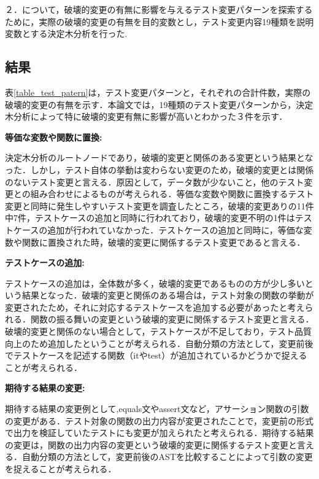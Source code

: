 \documentclass[uplatex,dvipdfmx,a4paper,twocolumn,base=11pt,jbase=11pt,ja=standard]{bxjsarticle}  %
\begin{document}
２．について，破壊的変更の有無に影響を与えるテスト変更パターンを探索するために，実際の破壊的変更の有無を目的変数とし，テスト変更内容19種類を説明変数とする決定木分析を行った.

\subsection{結果}

表\ref{table_test_patern}は，テスト変更パターンと，それぞれの合計件数，実際の破壊的変更の有無を示す．本論文では，19種類のテスト変更パターンから，決定木分析によって特に破壊的変更有無に影響が高いとわかった３件を示す．

\noindent\textbf{等価な変数や関数に置換: }

決定木分析のルートノードであり，破壊的変更と関係のある変更という結果となった．しかし，テスト自体の挙動は変わらない変更のため，破壊的変更とは関係のないテスト変更と言える．原因として，データ数が少ないこと，他のテスト変更との組み合わせによるものが考えられる．等価な変数や関数に置換するテスト変更と同時に発生しやすいテスト変更を調査したところ，破壊的変更ありの11件中7件，テストケースの追加と同時に行われており，破壊的変更不明の1件はテストケースの追加が行われていなかった．テストケースの追加と同時に，等価な変数や関数に置換された時，破壊的変更に関係するテスト変更であると言える．

\noindent\textbf{テストケースの追加: }

テストケースの追加は，全体数が多く，破壊的変更であるものの方が少し多いという結果となった．破壊的変更と関係のある場合は，テスト対象の関数の挙動が変更されたため，それに対応するテストケースを追加する必要があったと考えられる．関数の振る舞いの変更という破壊的変更に関係するテスト変更と言える．破壊的変更と関係のない場合として，テストケースが不足しており，テスト品質向上のため追加したということが考えられる．自動分類の方法として，変更前後でテストケースを記述する関数（itやtest）が追加されているかどうかで捉えることが考えられる．
    
\noindent\textbf{期待する結果の変更: }

期待する結果の変更例として,equals文やassert文など，アサーション関数の引数の変更がある．テスト対象の関数の出力内容が変更されたことで，変更前の形式で出力を検証していたテストにも変更が加えられたと考えられる．期待する結果の変更は，関数の出力内容の変更という破壊的変更に関係するテスト変更と言える．自動分類の方法として，変更前後のASTを比較することによって引数の変更を捉えることが考えられる．
\end{document}
